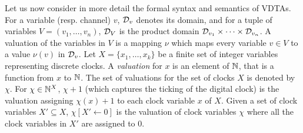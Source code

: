 Let us now consider in more detail the formal syntax and semantics of VDTAs.
%
For a variable (resp. channel) $v$, ${\cal D}_v$ denotes its domain,
and for a tuple of variables $V= (v_1, \ldots, v_n)$,
${\cal D}_V$ is the product domain ${\cal D}_{v_1} \times \cdots \times {\cal D}_{v_n}$.
A valuation of the variables in $V$
is a mapping $\nu$ which maps every variable $v \in V$ to a value $\nu(v)$ in ${\cal D}_v$.
%
Let $X=\{x_1,\ldots, x_k\}$ be a finite set of integer variables representing discrete clocks.
%
A {\em valuation} for $x$ is an element of $\mathbb{N}$, that is a function from $x$ to $\mathbb{N}$.
The set of valuations for the set of clocks $X$ is denoted by $\chi$.
%
For $\chi\in\mathbb{N}^X$, $\chi+1$ (which captures the ticking of the digital clock) is the valuation assigning $\chi(x)+1$ to each clock variable $x$ of $X$.
Given a set of clock variables $X' \subseteq X$, $\chi[X' \leftarrow 0]$ is the valuation of clock variables $\chi$ where all the clock variables in $X'$ are assigned to $0$.

